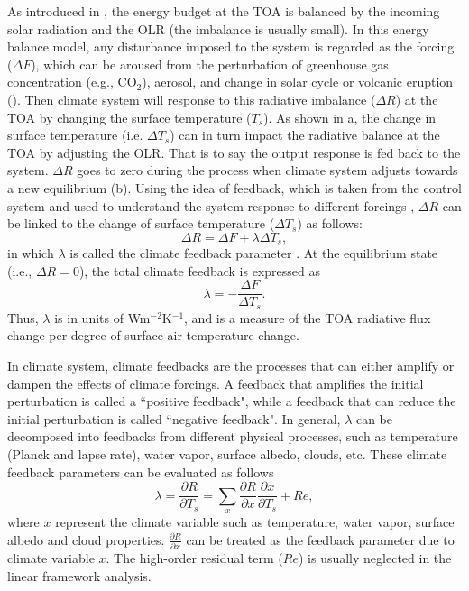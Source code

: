 As introduced in , the energy budget at the TOA is balanced by the incoming solar radiation and the OLR (the imbalance is usually small). In this energy balance model, any disturbance imposed to the system is regarded as the forcing ($\Delta F$), which can be aroused from the perturbation of greenhouse gas concentration (e.g., CO$_2$), aerosol, and change in solar cycle or volcanic eruption (). Then climate system will response to this radiative imbalance ($\Delta R$) at the TOA  by changing the surface temperature ($T_s$). As shown in a, the change in surface temperature (i.e. $\Delta T_s$) can in turn impact the radiative balance at the TOA by adjusting the OLR. That is to say the output response is fed back to the system. $\Delta R$ goes to zero during the process when climate system adjusts towards a new equilibrium (b). Using the idea of feedback, which is taken from the control system and used to understand the system response to different forcings \citep{Stephens2005cloud},
$\Delta R$ can be linked to the change of surface temperature ($\Delta T_s$) as follows:
\begin{equation}
    \Delta R = \Delta F + \lambda \Delta T_s,
    \label{eq:imbalance_forcing_lambda}
\end{equation}
in which $\lambda$ is called the climate feedback parameter \citep{Gregory2004}. 
At the equilibrium state (i.e., $\Delta R=0$), the total climate feedback is expressed as 
\begin{equation}
    \lambda = -\frac{\Delta F}{\Delta T_s}.
\end{equation}
Thus, $\lambda$ is in units of Wm$^{-2}$K$^{-1}$, and is a measure of the TOA radiative flux change per degree of surface air temperature change.

In climate system, climate feedbacks are the processes that can either amplify or dampen the effects of climate forcings. A feedback that amplifies the initial perturbation is called a ``positive feedback", while a feedback that can reduce the initial perturbation is called ``negative feedback". In general, $\lambda$ can be decomposed into feedbacks from different physical processes, such as temperature (Planck and lapse rate), water vapor, surface albedo, clouds, etc. These climate feedback parameters can be evaluated as follows
\begin{equation}
    \lambda = \frac{\partial R}{\partial T_s} = \sum_x \frac{\partial R}{\partial x}\frac{\partial x}{\partial T_s} + Re, %
    \label{eq:lambda}
\end{equation}
where $x$ represent the climate variable such as temperature, water vapor, surface albedo and cloud properties. $\frac{\partial R}{\partial x}$ can be treated as the feedback parameter due to climate variable $x$. The high-order residual term ($Re$) is usually neglected in the linear framework analysis.

